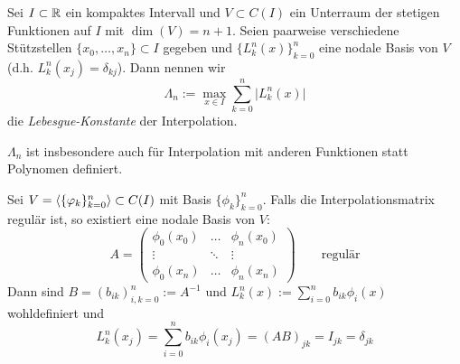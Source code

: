 \documentclass[
]{mycourse}
\begin{document}
\begin{df} \label{1.17}
	Sei $I\subset \mathbb{R}$ ein kompaktes Intervall und $V\subset C(I)$ ein Unterraum der stetigen Funktionen auf $I$ mit $\dim(V)=n+1$.
	Seien paarweise verschiedene Stützstellen $\{x_0,\dotsc, x_n\}\subset I$ gegeben und $\{L_k^n(x)\}_{k=0}^n$ eine nodale Basis von $V$ (d.h. $L_k^n(x_j) = \delta_{kj}$).
	Dann nennen wir
	\[
		\Lambda_n := \max_{x\in I}\sum_{k=0}^n \big|L_k^n(x)\big|
	\]
	die \emph{Lebesgue-Konstante} der Interpolation.
\end{df}

\begin{note}
	$\Lambda_n$ ist insbesondere auch für Interpolation mit anderen Funktionen statt Polynomen definiert.

	Sei $V=\langle\{\varphi_k\}_{k=0}^n\rangle \subset C(I)$ mit Basis $\{\phi_k\}_{k=0}^n$.
	Falls die Interpolationsmatrix regulär ist, so existiert eine nodale Basis von $V$:
	\[
		A=\begin{pmatrix}
			\phi_0(x_0) & \hdots & \phi_n(x_0)\\
			\vdots & \ddots & \vdots\\
			\phi_0(x_n) & \hdots & \phi_n(x_n)
		\end{pmatrix}
		\qquad \text{regulär}
	\]
	Dann sind $B=(b_{ik})_{i,k=0}^n := A^{-1}$ und $L_k^n(x) := \sum_{i=0}^n b_{ik}\phi_i(x)$ wohldefiniert und
	\[
		L_k^n (x_j) = \sum_{i=0}^n b_{ik}\phi_i(x_j) = (A B)_{jk} = I_{jk} = \delta_{jk}
	\]
\end{note}
\end{document}
